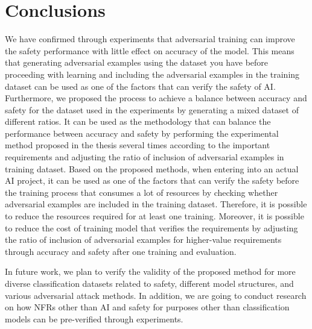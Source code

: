 \documentclass[journal,article,submit,moreauthors,pdftex]{Definitions/mdpi}
\begin{document}
\section{Conclusions}

We have confirmed through experiments that adversarial training can improve the safety performance with little effect on accuracy of the model.
This means that generating adversarial examples using the dataset you have before proceeding with learning and including the adversarial examples in the training dataset can be used as one of the factors that can verify the safety of AI.
Furthermore, we proposed the process to achieve a balance between accuracy and safety for the dataset used in the experiments by generating a mixed dataset of different ratios.
It can be used as the methodology that can balance the performance between accuracy and safety by performing the experimental method proposed in the thesis several times according to the important requirements and adjusting the ratio of inclusion of adversarial examples in training dataset.
Based on the proposed methods, when entering into an actual AI project, it can be used as one of the factors that can verify the safety before the training process that consumes a lot of resources by checking whether adversarial examples are included in the training dataset.
Therefore, it is possible to reduce the resources required for at least one training.
Moreover, it is possible to reduce the cost of training model that verifies the requirements by adjusting the ratio of inclusion of adversarial examples for higher-value requirements through accuracy and safety after one training and evaluation.

In future work, we plan to verify the validity of the proposed method for more diverse classification datasets related to safety, different model structures, and various adversarial attack methods.
In addition, we are going to conduct research on how NFRs other than AI and safety for purposes other than classification models can be pre-verified through experiments.

\vspace{6pt} 


\end{document}
